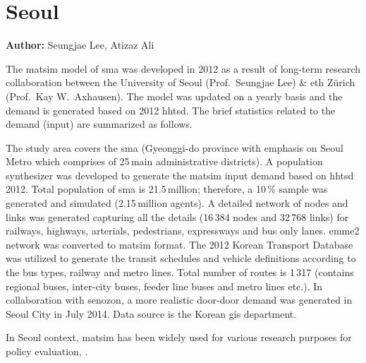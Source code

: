\section{Seoul}
\label{sec:seoul}
\hfill \textbf{Author:} Seungjae Lee, Atizaz Ali

The \gls{matsim} model of \gls{sma} was developed in 2012 as a result of long-term research collaboration between the University of Seoul (Prof.\ Seungjae Lee) \& \gls{eth} Zürich (Prof.\ Kay W.\ Axhausen). The model was updated on a yearly basis and the demand is generated based on 2012 \gls{hhtsd}. The brief statistics related to the demand (input) are summarized as follows. 

The study area covers the \gls{sma} (Gyeonggi-do province with emphasis on Seoul Metro which comprises of 25\,main administrative districts). A population synthesizer was developed to generate the \gls{matsim} input demand based on \gls{hhtsd} 2012. Total population of \gls{sma} is 21.5\,million; therefore, a 10\,\% sample was generated and simulated (2.15\,million agents). A detailed network of nodes and links was generated capturing all the details (16\,384 nodes and 32\,768 links) for railways, highways, arterials, pedestrians, expressways and bus only lanes. \gls{emme2} network was converted to \gls{matsim} format. The 2012 Korean Transport Database was utilized to generate the transit schedules and vehicle definitions according to the bus types, railway and metro lines. Total number of routes is 1\,317 (contains regional buses, inter-city buses, feeder line buses and metro lines etc.). In collaboration with \gls{senozon}, a more realistic door-door demand was generated in Seoul City in July 2014. Data source is the Korean \gls{gis} department.

In Seoul context, \gls{matsim} has been widely used for various research purposes for policy evaluation, \citet[e.g.,][]{KimEtAl_IJHE_2012, LeeAli_unpub_IWUTSCD_2014}.

